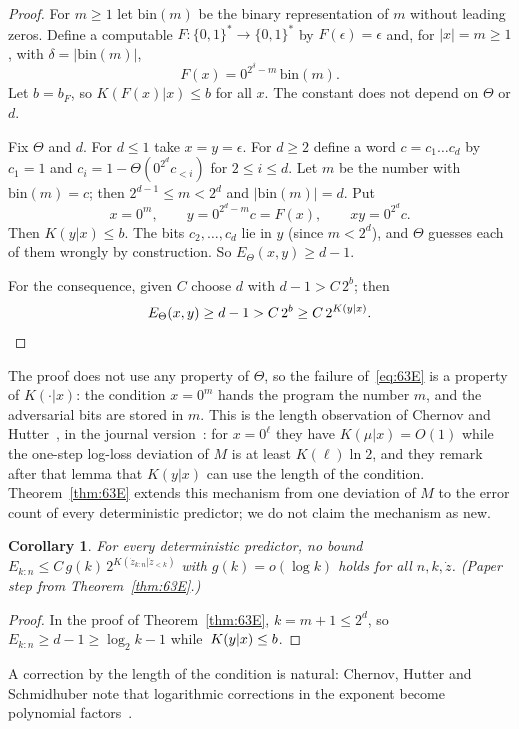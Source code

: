\documentclass[11pt]{article}
\newcommand{\Bs}{\{0,1\}^*}
\newcommand{\eps}{\epsilon}
\newtheorem{corollary}[theorem]{Corollary}
\theoremstyle{definition}
\theoremstyle{remark}
\begin{document}
\begin{proof}
For $m\ge1$ let $\mathrm{bin}(m)$ be the binary representation of $m$ without
leading zeros. Define a computable $F:\Bs\to\Bs$ by $F(\eps)=\eps$ and, for
$|x|=m\ge1$, with $\delta=|\mathrm{bin}(m)|$,
\[
F(x)=0^{2^\delta-m}\,\mathrm{bin}(m).
\]
Let $b=b_F$, so $K(F(x)|x)\le b$ for all $x$. The constant does not depend on
$\Theta$ or $d$.

Fix $\Theta$ and $d$. For $d\le1$ take $x=y=\eps$. For $d\ge2$ define a word
$c=c_1\dots c_d$ by $c_1=1$ and $c_i=1-\Theta(0^{2^d}c_{<i})$ for $2\le i\le d$.
Let $m$ be the number with $\mathrm{bin}(m)=c$; then $2^{d-1}\le m<2^d$ and
$|\mathrm{bin}(m)|=d$. Put
\[
x=0^m,\qquad y=0^{2^d-m}c=F(x),\qquad xy=0^{2^d}c .
\]
Then $K(y|x)\le b$. The bits $c_2,\dots,c_d$ lie in $y$ (since $m<2^d$), and
$\Theta$ guesses each of them wrongly by construction. So $E_\Theta(x,y)\ge d-1$.

For the consequence, given $C$ choose $d$ with $d-1>C\,2^b$; then
\[
E_\Theta(x,y)\ge d-1>C\,2^{b}\ge C\,2^{K(y|x)}.\qedhere
\]
\end{proof}

The proof does not use any property of $\Theta$, so the failure of~\eqref{eq:63E}
is a property of $K(\cdot|x)$: the condition $x=0^m$ hands the program the
number $m$, and the adversarial bits are stored in $m$. This is the length
observation of Chernov and Hutter~\cite{chernovhutter2005}, in the journal
version~\cite[Lemma~5]{chernovhutterschmidhuber2007}: for $x=0^\ell$ they have
$K(\mu|x)=O(1)$ while the one-step log-loss deviation of $M$ is at least
$K(\ell)\ln2$, and they remark after that lemma that $K(y|x)$ can use the length of
the condition. Theorem~\ref{thm:63E} extends this mechanism from one deviation
of $M$ to the error count of every deterministic predictor; we do not claim the
mechanism as new.

\begin{corollary}\label{cor:63rate}
For every deterministic predictor, no bound
$E_{k:n}\le C\,g(k)\,2^{K(\dot z_{k:n}|\dot z_{<k})}$ with $g(k)=o(\log k)$
holds for all $n,k,\dot z$. (Paper step from Theorem~\ref{thm:63E}.)
\end{corollary}

\begin{proof}
In the proof of Theorem~\ref{thm:63E}, $k=m+1\le2^d$, so $E_{k:n}\ge d-1\ge\log_2k-1$
while~$K(y|x)\le\nobreak b$.
\end{proof}

A correction by the length of the condition is natural:
Chernov, Hutter and Schmidhuber note that logarithmic corrections in the
exponent become polynomial factors~\cite[p.~9]{chernovhutterschmidhuber2007}.
\end{document}
